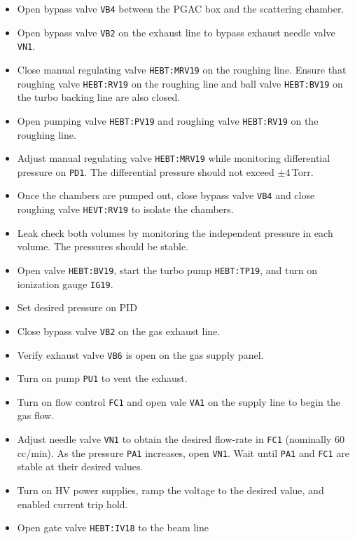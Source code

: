 \begin{itemize}
\setlength{\itemsep}{0pt}
\setlength{\parskip}{0pt}
\setlength{\parsep}{0pt}
\item Open bypass valve \texttt{VB4} between the PGAC box and the scattering chamber.
\item Open bypass valve \texttt{VB2} on the exhaust line to bypass exhaust needle valve \texttt{VN1}.
\item Close manual regulating valve \texttt{HEBT:MRV19} on the roughing line.   Ensure that roughing valve \texttt{HEBT:RV19} on the roughing line and ball valve \texttt{HEBT:BV19} on the turbo backing line are also closed.
\item Open pumping valve \texttt{HEBT:PV19} and roughing valve \texttt{HEBT:RV19} on the roughing line.
\item Adjust manual regulating valve \texttt{HEBT:MRV19}  while monitoring differential pressure on \texttt{PD1}.  The differential pressure should not exceed $\pm$4\,Torr.
\item Once the chambers are pumped out, close bypass valve \texttt{VB4} and close roughing valve \texttt{HEVT:RV19} to isolate the chambers.
\item Leak check both volumes by monitoring the independent pressure in each volume.  The pressures should be stable.
\item Open valve \texttt{HEBT:BV19}, start the turbo pump \texttt{HEBT:TP19}, and turn on ionization gauge \texttt{IG19}.
\item Set desired pressure on PID
\item Close bypass valve \texttt{VB2} on the gas exhaust line. %
\item Verify exhaust valve  \texttt{VB6} is open on the gas supply panel.
\item Turn on pump \texttt{PU1} to vent the exhaust.
\item Turn on flow control \texttt{FC1} and open vale \texttt{VA1} on the supply line to begin the gas flow.
\item Adjust needle valve \texttt{VN1} to obtain the desired flow-rate in \texttt{FC1} (nominally 60\,cc/min).  As the pressure \texttt{PA1} increases, open \texttt{VN1}. Wait until \texttt{PA1} and \texttt{FC1} are stable at their desired values.
\item Turn on HV power supplies, ramp the voltage to the desired value, and enabled current trip hold.
\item Open gate valve \texttt{HEBT:IV18} to the beam line
\end{itemize}
